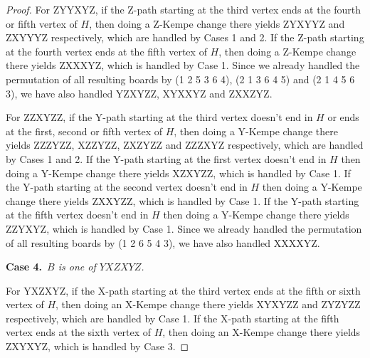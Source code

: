 \documentclass[12pt]{article}
\theoremstyle{plain}
\theoremstyle{definition}
\theoremstyle{remark}
\newcommand{\case}[2]{{\bf Case #1.}~{\it #2}~~}
\begin{document}
\begin{proof}
	
	For ZYYXYZ, if the Z-path starting at the third vertex ends at the fourth or fifth vertex of $H$, then doing a Z-Kempe change there yields ZYXYYZ and ZXYYYZ respectively, which are handled by Cases 1 and 2.
	If the Z-path starting at the fourth vertex ends at the fifth vertex of $H$, then doing a Z-Kempe change there yields ZXXXYZ, which is handled by Case 1.
	Since we already handled the permutation of all resulting boards by (1 2 5 3 6 4), (2 1 3 6 4 5) and (2 1 4 5 6 3), we have also handled YZXYZZ, XYXXYZ and ZXXZYZ.
	
	
	For ZZXYZZ, if the Y-path starting at the third vertex doesn't end in $H$ or ends at the first, second or fifth vertex of $H$, then doing a Y-Kempe change there yields ZZZYZZ, XZZYZZ, ZXZYZZ and ZZZXYZ respectively, which are handled by Cases 1 and 2.
	If the Y-path starting at the first vertex doesn't end in $H$ then doing a Y-Kempe change there yields XZXYZZ, which is handled by Case 1.
	If the Y-path starting at the second vertex doesn't end in $H$ then doing a Y-Kempe change there yields ZXXYZZ, which is handled by Case 1.
	If the Y-path starting at the fifth vertex doesn't end in $H$ then doing a Y-Kempe change there yields ZZYXYZ, which is handled by Case 1.
	Since we already handled the permutation of all resulting boards by (1 2 6 5 4 3), we have also handled XXXXYZ.
	
	
	\case{4}{$B$ is one of $YXZXYZ$.}
	
	
	For YXZXYZ, if the X-path starting at the third vertex ends at the fifth or sixth vertex of $H$, then doing an X-Kempe change there yields XYXYZZ and ZYZYZZ respectively, which are handled by Case 1.
	If the X-path starting at the fifth vertex ends at the sixth vertex of $H$, then doing an X-Kempe change there yields ZXYXYZ, which is handled by Case 3.
	
\end{proof}
\end{document}
